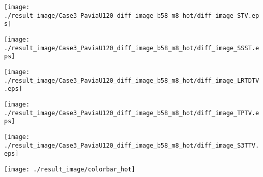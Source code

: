 \begin{figure*}[t]
\begin{center}
        \begin{minipage}{0.150\hsize}
            \centerline{\hspace{\hsize}} %
		\end{minipage}
        \begin{minipage}{0.150\hsize}
            \centerline{\texttt{[image: ./result\_image/Case3\_PaviaU120\_diff\_image\_b58\_m8\_hot/diff\_image\_STV.eps]}} %
        \end{minipage}
        \begin{minipage}{0.150\hsize}
            \centerline{\texttt{[image: ./result\_image/Case3\_PaviaU120\_diff\_image\_b58\_m8\_hot/diff\_image\_SSST.eps]}} %
        \end{minipage}
        \begin{minipage}{0.150\hsize}
            \centerline{\texttt{[image: ./result\_image/Case3\_PaviaU120\_diff\_image\_b58\_m8\_hot/diff\_image\_LRTDTV.eps]}} %
        \end{minipage}
        \begin{minipage}{0.150\hsize}
            \centerline{\texttt{[image: ./result\_image/Case3\_PaviaU120\_diff\_image\_b58\_m8\_hot/diff\_image\_TPTV.eps]}} %
        \end{minipage}
        \begin{minipage}{0.150\hsize}
            \centerline{\texttt{[image: ./result\_image/Case3\_PaviaU120\_diff\_image\_b58\_m8\_hot/diff\_image\_S3TTV.eps]}} %
        \end{minipage}
        \begin{minipage}{0.055\hsize}
            \centerline{\texttt{[image: ./result\_image/colorbar\_hot]}} %
        \end{minipage}

        \vspace{1mm}
        

\end{center}
\end{figure*}
